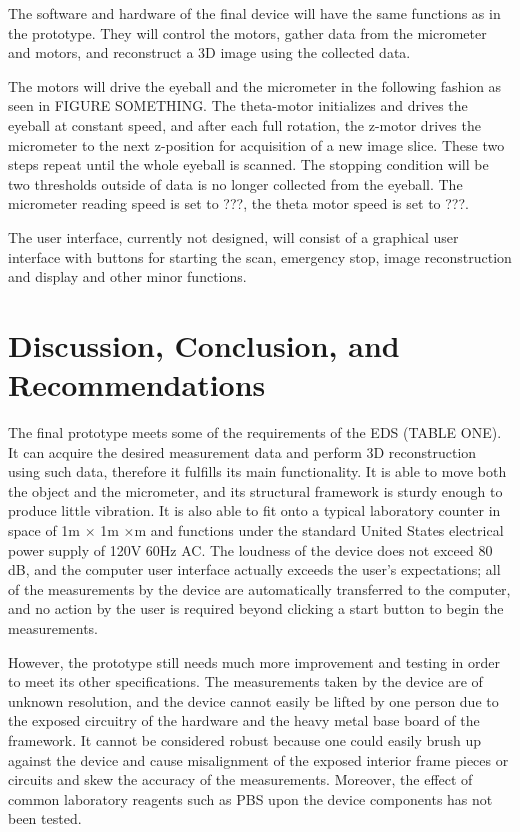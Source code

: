 \documentclass{article}
\begin{document}
The software and hardware of the final device will have the same functions as in the prototype. They will control the motors, gather data from the micrometer and motors, and reconstruct a 3D image using the collected data. 

The motors will drive the eyeball and the micrometer in the following fashion as seen in FIGURE SOMETHING. The theta-motor initializes and drives the eyeball at constant speed, and after each 
full rotation, the z-motor drives the micrometer to the next z-position for acquisition of a new image slice. These two steps repeat until the whole eyeball is scanned. The stopping condition will be two thresholds outside of data is no longer collected from the eyeball. The micrometer reading speed is set to ???, the theta motor speed is set to ???.

The user interface, currently not designed, will consist of a graphical user interface with buttons for starting the scan, emergency stop, image reconstruction and display and other minor functions. 


\section{Discussion, Conclusion, and Recommendations}
\label{sec:concl-recomm}

The final prototype meets some of the requirements of the EDS (TABLE ONE). It can acquire the desired measurement data and perform 3D reconstruction using such data, therefore it fulfills its main functionality. It is able to move both the object and the micrometer, and its structural framework is sturdy enough to produce little vibration.  It is also able to fit onto a typical laboratory counter in space of 1m $\times$ 1m $\times$\1m and functions under the standard United States electrical power supply of 120V 60Hz AC. The loudness of the device does not exceed 80 dB, and the computer user interface actually exceeds the user’s expectations; all of the measurements by the device are automatically transferred to the computer, and no action by the user is required beyond clicking a start button to begin the measurements. 

However, the prototype still needs much more improvement and testing in order to meet its other specifications. The measurements taken by the device are of unknown resolution, and the device cannot easily be lifted by one person due to the exposed circuitry of the hardware and the heavy metal base board of the framework.  It cannot be considered robust because one could easily brush up against the device and cause misalignment of the exposed interior frame pieces or circuits and skew the accuracy of the measurements. Moreover, the effect of common laboratory reagents such as PBS upon the device components has not been tested. 
\end{document}
